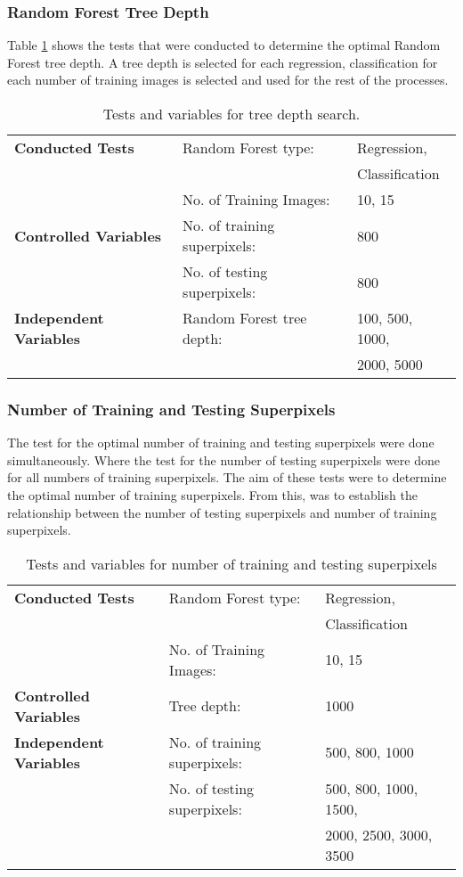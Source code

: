\subsubsection{Random Forest Tree Depth}
Table \ref{table:treedepth} shows the tests that were conducted to determine the optimal Random Forest tree depth. A tree depth is selected for each regression, classification for each number of training images is selected and used for the rest of the processes.

\begin{table}[H]
\centering
\caption{Tests and variables for tree depth search.}

\begin{tabular}{|l|ll|}
\hline
\textbf{Conducted Tests}	& Random Forest type: & Regression,\\
	& 	& Classification\\		
	&  No. of Training Images: & 10, 15\\
\hline
\textbf{Controlled Variables} & No. of training superpixels: & 800 \\
	& No. of testing superpixels: & 800\\
\hline
\textbf{Independent Variables} & Random Forest tree depth: & 100, 500, 1000,\\
	& 	& 2000, 5000\\
\hline				    	 			   			    	 
\end{tabular}
\label{table:treedepth}
\end{table}

\subsubsection{Number of Training and Testing Superpixels}
The test for the optimal number of training and testing superpixels were done simultaneously. Where the test for the number of testing superpixels were done for all numbers of training superpixels. The aim of these tests were to determine the optimal number of training superpixels. From this, was to establish the relationship between the number of testing superpixels and number of training superpixels.
\begin{table}[H]
\centering
\caption{Tests and variables for number of training and testing superpixels}

\begin{tabular}{|l|ll|}
\hline
\textbf{Conducted Tests}	& Random Forest type: & Regression,\\
	& 	& Classification\\		
	&  No. of Training Images: & 10, 15\\
\hline
\textbf{Controlled Variables} & Tree depth: & 1000 \\
\hline
\textbf{Independent Variables} & No. of training superpixels: & 500, 800, 1000 \\
	& No. of testing superpixels: & 500, 800, 1000, 1500,  \\
	&	 & 2000, 2500, 3000, 3500 \\
\hline				    	 			   			    	 
\end{tabular}
\label{table:numpixels}
\end{table}

